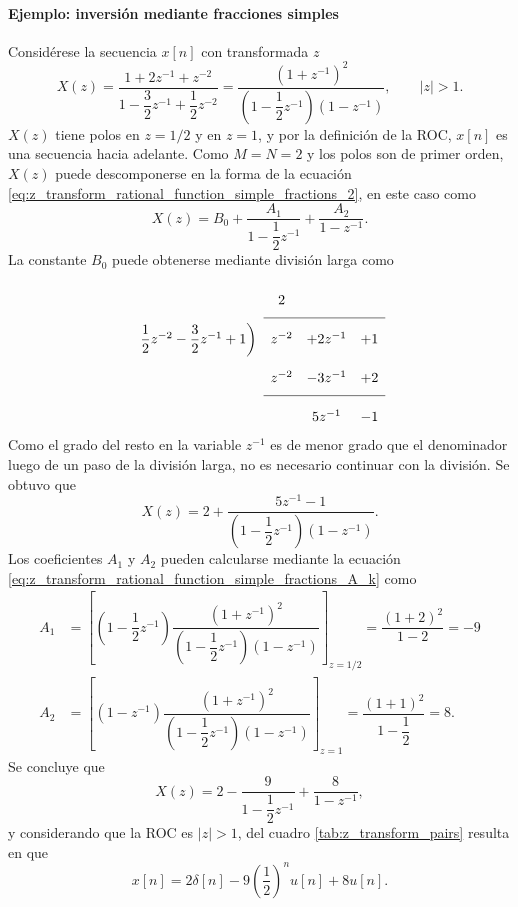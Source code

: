 \documentclass[a4paper]{report}
\begin{document}
\paragraph{Ejemplo: inversión mediante fracciones simples} Considérese la secuencia \(x[n]\) con transformada \(z\)
\[
 X(z)=\dfrac{1+2z^{-1}+z^{-2}}{1-\dfrac{3}{2}z^{-1}+\dfrac{1}{2}z^{-2}}
  =\dfrac{(1+z^{-1})^2}{\left(1-\dfrac{1}{2}z^{-1}\right)\left(1-z^{-1}\right)},
  \qquad 
  |z|>1.
\]
\(X(z)\) tiene polos en \(z=1/2\) y en \(z=1\), y por la definición de la ROC, \(x[n]\) es una secuencia hacia adelante. Como \(M=N=2\) y los polos son de primer orden, \(X(z)\) puede descomponerse en la forma de la ecuación \ref{eq:z_transform_rational_function_simple_fractions_2}, en este caso como
\[
 X(z)=B_0+\dfrac{A_1}{1-\dfrac{1}{2}z^{-1}}+\dfrac{A_2}{1-z^{-1}}.
\]
La constante \(B_0\) puede obtenerse mediante división larga como
\[
\setlength\extrarowheight{10pt}
\begin{array}[t]{cccc}
                       & 2 &   &    \\[\medskipamount]
\cline{2-4}
\dfrac{1}{2}z^{-2}-\dfrac{3}{2}z^{-1}+1 
                \bigg) & z^{-2} & +2z^{-1} & +1 \\
                       & z^{-2} & -3z^{-1} & +2  \\[\medskipamount]
\cline{2-4}
                       &    & 5z^{-1} & -1  
\end{array}
\]
Como el grado del resto en la variable \(z^{-1}\) es de menor grado que el denominador luego de un paso de la división larga, no es necesario continuar con la división. Se obtuvo que 
\[
 X(z)=2+\dfrac{5z^{-1}-1}{\left(1-\dfrac{1}{2}z^{-1}\right)\left(1-z^{-1}\right)}.
\]
Los coeficientes \(A_1\) y \(A_2\) pueden calcularse mediante la ecuación \ref{eq:z_transform_rational_function_simple_fractions_A_k} como
\begin{align*}
 A_1&=\left[\left(1-\dfrac{1}{2}z^{-1}\right)\dfrac{(1+z^{-1})^2}{\left(1-\dfrac{1}{2}z^{-1}\right)\left(1-z^{-1}\right)}\right]_{z=1/2}=\dfrac{(1+2)^2}{1-2}=-9\\
 A_2&=\left[\left(1-z^{-1}\right)\dfrac{(1+z^{-1})^2}{\left(1-\dfrac{1}{2}z^{-1}\right)\left(1-z^{-1}\right)}\right]_{z=1}=\dfrac{(1+1)^2}{1-\dfrac{1}{2}}=8.
\end{align*}
Se concluye que 
\[
 X(z)=2-\dfrac{9}{1-\dfrac{1}{2}z^{-1}}+\dfrac{8}{1-z^{-1}},
\]
y considerando que la ROC es \(|z|>1\), del cuadro \ref{tab:z_transform_pairs} resulta en que 
\[
 x[n]=2\delta[n]-9\left(\frac{1}{2}\right)^nu[n]+8u[n].
\]
\end{document}
